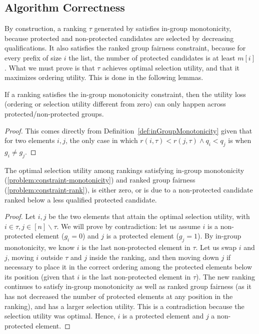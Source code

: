 \subsection{Algorithm Correctness}\label{subsec:algorithm-correctness}

By construction, a ranking $\tau$ generated by \algoFAIR satisfies in-group monotonicity, because protected and non-protected candidates are selected by decreasing qualifications.
%
It also satisfies the ranked group fairness constraint, because for every prefix of size $i$ the list, the number of protected candidates is at least $m[i]$. 
%
What we must prove is that $\tau$ achieves optimal selection utility, and that it maximizes ordering utility. 
%
This is done in the following lemmas.

\begin{lemma}\label{lemma:across}
	If a ranking satisfies the in-group monotonicity constraint, then the utility loss (ordering or selection utility different from zero) can only happen across protected/non-protected groups.
\end{lemma}

\begin{proof}
	This comes directly from Definition~\ref{def:inGroupMonotonicity} given that for two elements $i,j$, the only case in which $r(i,\tau) < r(j,\tau) \wedge q_i < q_j$ is when $g_i \ne g_j$.
\end{proof}

\begin{lemma}
	The optimal selection utility among rankings satisfying in-group monotonicity (\ref{problem:constraint-monotonicity}) and ranked group fairness (\ref{problem:constraint-rank}), is either zero, or is due to a non-protected candidate ranked below a less qualified protected candidate.
\end{lemma}

\begin{proof}
	Let $i,j$ be the two elements that attain the optimal selection utility, with $i \in \tau, j \in [n] \backslash \tau$.
	We will prove by contradiction: let us assume $i$ is a non-protected element ($g_i=0$) and $j$ is a protected element ($g_j=1$). 
	By in-group monotonicity, we know $i$ is the last non-protected element in $\tau$. Let us swap $i$ and $j$, moving $i$ outside $\tau$ and $j$ inside the ranking, and then moving down $j$ if necessary to place it in the correct ordering among the protected elements below its position (given that $i$ is the last non-protected element in $\tau$). 
	The new ranking continues to satisfy in-group monotonicity as well as ranked group fairness (as it has not decreased the number of protected elements at any position in the ranking), and has a larger selection utility. 
	This is a contradiction because the selection utility was optimal. Hence, $i$ is a protected element and $j$ a non-protected element.
\end{proof}

